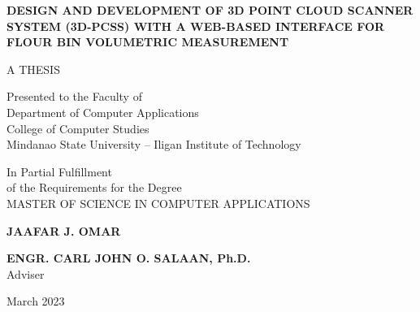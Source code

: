 \documentclass[a4paper, 12pt]{report}
\begin{document}
\begin{titlepage}
	\setlength{\topmargin}{-40pt}
	\setlength{\textheight}{664pt}
	\begin{singlespace}
		\begin{center}
			\textbf{\MakeUppercase{Design and Development of 3D Point Cloud Scanner System (3D-PCSS) with A Web-based Interface for Flour Bin Volumetric Measurement}}
			\vspace{2.50cm}

			\MakeUppercase{A THESIS}

			\vspace{2.0cm}

			Presented to the Faculty of\\
			Department of Computer Applications\\
			College of Computer Studies \\
			Mindanao State University -- Iligan Institute of Technology

			\vspace{2.0cm}


			In Partial Fulfillment\\
			of the Requirements for the Degree\\
			MASTER OF SCIENCE IN COMPUTER APPLICATIONS

			\vspace{2.25cm}

			\textbf{JAAFAR J. OMAR}

			\vspace{3.0cm}

			\textbf{ENGR. CARL JOHN O. SALAAN, Ph.D.} \\
			Adviser
			\vspace{2.0cm}

			March 2023

		\end{center}
	\end{singlespace}
\end{titlepage}

\tableofcontents
\listoffigures
\listoftables










\appendix

\end{document}
